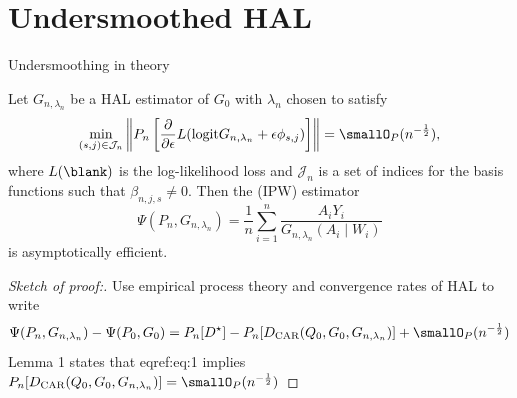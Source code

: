 \documentclass[smaller]{beamer}\usepackage{listings}
\begin{document}
\section{Undersmoothed HAL}
\label{sec:orge3572c7}
\begin{frame}[label={sec:orgde4e993}]{Undersmoothing in theory}
\pause
\begin{theorem}
Let \(G_{n,\lambda_n}\) be a HAL estimator of \(G_0\) with $\lambda_n$ chosen to satisfy
\begin{equation}
  \label{eq:1}
  \min_{(s,j) \in \mathcal{J}_n}\left\Vert P_n 
  \left[
    \frac{\partial }{\partial \epsilon} L(\mathrm{logit} G_{n, \lambda_n} + \epsilon \phi_{s,j}) 
  \right] 
\right\Vert = \smallO_P(n^{- \frac 1 2}),
\end{equation}
where $L(\blank)$ is the log-likelihood loss and $\mathcal{J}_n$ is a set of indices for the basis
functions such that $\beta_{n,j,s} \not = 0$. Then the (IPW) estimator
\begin{equation*}
  \Psi(P_n, G_{n, \lambda_n}) = \frac{1}{n}\sum_{i=1}^{n}\frac{A_iY_i}{G_{n,\lambda_n}(A_i \mid W_i)}
\end{equation*}
is asymptotically efficient. \pause
\end{theorem}

\begin{proof}[Sketch of proof:]
Use empirical process theory and convergence rates of HAL to write
\begin{equation*}
  \Psi(P_n, G_{n, \lambda_n}) - \Psi(P_0, G_0) = P_n[D^{\star}]
  - P_n[D_{\text{CAR}}(Q_0, G_0, G_{n,\lambda_n})] + \smallO_P(n^{- \frac 1 2})
\end{equation*}
\pause Lemma 1 states that eqref:eq:1 implies \(P_n[D_{\text{CAR}}(Q_0, G_0, G_{n,\lambda_n})] =
\smallO_P(n^{- \frac 1 2})\)
\end{proof}
\end{frame}
\end{document}
